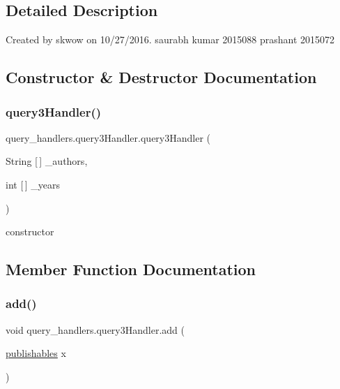 \subsection{Detailed Description}
Created by skwow on 10/27/2016. saurabh kumar 2015088 prashant 2015072 

\subsection{Constructor \& Destructor Documentation}
\hypertarget{classquery__handlers_1_1query3_handler_aa874c1b45238e159383eb3d7ebf7efaa}{}\label{classquery__handlers_1_1query3_handler_aa874c1b45238e159383eb3d7ebf7efaa} 
\subsubsection{\texorpdfstring{query3\+Handler()}{query3Handler()}}
{\footnotesize\ttfamily query\+\_\+handlers.\+query3\+Handler.\+query3\+Handler (\begin{DoxyParamCaption}\item[{String \mbox{[}$\,$\mbox{]}}]{\+\_\+authors,  }\item[{int \mbox{[}$\,$\mbox{]}}]{\+\_\+years }\end{DoxyParamCaption})}



constructor 



\subsection{Member Function Documentation}
\hypertarget{classquery__handlers_1_1query3_handler_a19b8a0235fc333924fdc0948ea8cf856}{}\label{classquery__handlers_1_1query3_handler_a19b8a0235fc333924fdc0948ea8cf856} 
\subsubsection{\texorpdfstring{add()}{add()}}
{\footnotesize\ttfamily void query\+\_\+handlers.\+query3\+Handler.\+add (\begin{DoxyParamCaption}\item[{\hyperlink{class_data_1_1publishables}{publishables}}]{x }\end{DoxyParamCaption})}

